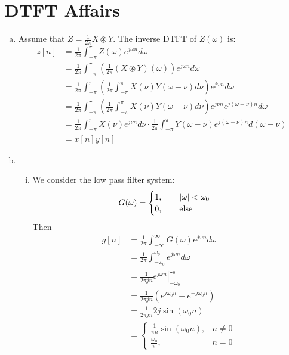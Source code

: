 \section{DTFT Affairs}\label{sec:p3}

\begin{enumerate}[(a)]
\item Assume that $Z = \frac{1}{2\pi} X \circledast Y$. The inverse DTFT of $Z(\omega)$ is:
\begin{align*}
	z[n]
	&= \frac{1}{2\pi} \int_{-\pi}^{\pi} Z(\omega) e^{j\omega n} d\omega \\
	&= \frac{1}{2\pi} \int_{-\pi}^{\pi} \left( \frac{1}{2\pi} (X \circledast Y)(\omega) \right) e^{j\omega n} d\omega \\
	&= \frac{1}{2\pi} \int_{-\pi}^{\pi} \left( \frac{1}{2\pi} \int_{-\pi}^{\pi} X(\nu)Y(\omega - \nu) d\nu \right) e^{j\omega n} d\omega \\
	&= \frac{1}{2\pi} \int_{-\pi}^{\pi} \left( \frac{1}{2\pi} \int_{-\pi}^{\pi} X(\nu)Y(\omega - \nu) d\nu \right) e^{j\nu n} e^{j(\omega - \nu) n} d\omega \\
	&= \frac{1}{2\pi} \int_{-\pi}^{\pi} X(\nu) e^{j\nu n} d\nu \cdot \frac{1}{2\pi} \int_{-\pi}^{\pi} Y(\omega - \nu)  e^{j(\omega - \nu) n} d(\omega - \nu) \\
	&= x[n] y[n]
\end{align*}

\item 
\begin{enumerate}[i.]
	\item We consider the low pass filter system:
	\[G(\omega) = \begin{cases}
	1, \qquad \left\lvert \omega \right\rvert < \omega_0\\
	0, \qquad \text{else}
	\end{cases}\]
	Then
	\begin{align*}
	g[n] 
	&= \frac{1}{2\pi} \int_{-\infty}^{\infty}G(\omega)e^{j \omega n} d\omega \\
	&= \frac{1}{2\pi} \int_{-\omega_0}^{\omega_o} e^{j \omega n} d\omega \\
	&= \frac{1}{2\pi j n} \left. e^{j \omega n}\right|_{-\omega_0}^{\omega_0} \\
	&= \frac{1}{2\pi j n} \left( e^{j \omega_0 n} - e^{-j\omega_0 n} \right) \\
	&= \frac{1}{2\pi j n} 2j\sin(\omega_0 n) \\
	&= \begin{cases}
	\frac{1}{\pi n}\sin(\omega_0 n), & n \neq 0 \\
	\frac{\omega_0}{\pi}, & n = 0
	\end{cases}
	\end{align*}
	

\end{enumerate}
\end{enumerate}
